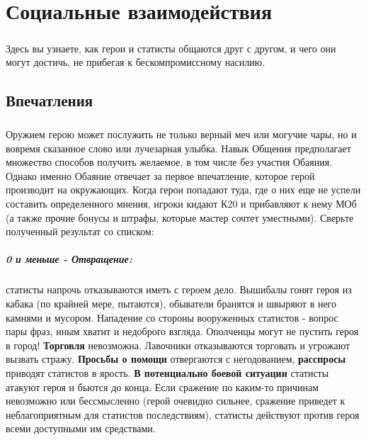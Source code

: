 \chapter{Социальные взаимодействия}
\paragraph{}
Здесь вы узнаете, как герои и статисты общаются друг с другом, и чего они могут достичь, не прибегая к бескомпромиссному насилию.
\section{Впечатления}
\paragraph{}
Оружием герою может послужить не только верный меч или могучие чары, но и вовремя сказанное слово или лучезарная улыбка. Навык Общения предполагает множество способов получить желаемое, в том числе без участия Обаяния. Однако именно Обаяние отвечает за первое впечатление, которое герой производит на окружающих. Когда герои попадают туда, где о них еще не успели составить определенного мнения, игроки кидают К20 и прибавляют к нему МОб (а также прочие бонусы и штрафы, которые мастер сочтет уместными). Сверьте полученный результат со списком:
\paragraph{0 и меньше - Отвращение:} статисты напрочь отказываются иметь с героем дело. Вышибалы гонят героя из кабака (по крайней мере, пытаются), обыватели бранятся и швыряют в него камнями и мусором. Нападение со стороны вооруженных статистов - вопрос пары фраз, иным хватит и недоброго взгляда. Ополченцы могут не пустить героя в город!
\newline
\textbf{Торговля} невозможна. Лавочники отказываются торговать и угрожают вызвать стражу.
\newline
\textbf{Просьбы о помощи} отвергаются с негодованием, \textbf{расспросы} приводят статистов в ярость.
\newline
\textbf{В потенциально боевой ситуации} статисты атакуют героя и бьются до конца. Если сражение по каким-то причинам невозможно или бессмысленно (герой очевидно сильнее, сражение приведет к неблагоприятным для статистов последствиям), статисты действуют против героя всеми доступными им средствами.
